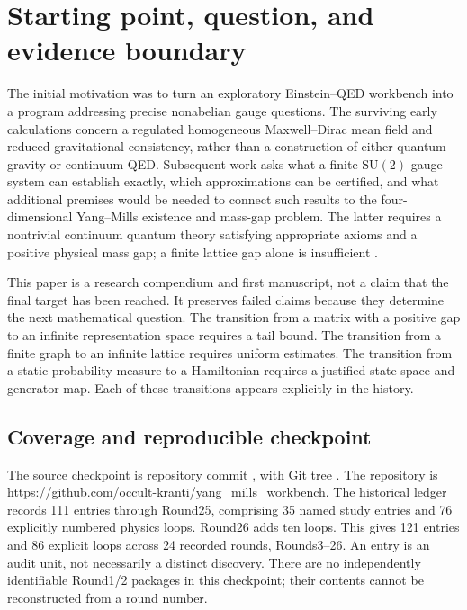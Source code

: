 \section{Starting point, question, and evidence boundary}
\label{sec:introduction}

The initial motivation was to turn an exploratory Einstein--QED workbench into a program addressing precise nonabelian gauge questions. The surviving early calculations concern a regulated homogeneous Maxwell--Dirac mean field and reduced gravitational consistency, rather than a construction of either quantum gravity or continuum QED. Subsequent work asks what a finite $\mathrm{SU}(2)$ gauge system can establish exactly, which approximations can be certified, and what additional premises would be needed to connect such results to the four-dimensional Yang--Mills existence and mass-gap problem. The latter requires a nontrivial continuum quantum theory satisfying appropriate axioms and a positive physical mass gap; a finite lattice gap alone is insufficient \cite{jaffe_witten}.

This paper is a research compendium and first manuscript, not a claim that the final target has been reached. It preserves failed claims because they determine the next mathematical question. The transition from a matrix with a positive gap to an infinite representation space requires a tail bound. The transition from a finite graph to an infinite lattice requires uniform estimates. The transition from a static probability measure to a Hamiltonian requires a justified state-space and generator map. Each of these transitions appears explicitly in the history.

\subsection{Coverage and reproducible checkpoint}
The source checkpoint is repository commit
,
with Git tree .
The repository is
\url{https://github.com/occult-kranti/yang_mills_workbench}.
The historical ledger records 111 entries through Round25, comprising 35 named study entries and 76 explicitly numbered physics loops. Round26 adds ten loops. This gives 121 entries and 86 explicit loops across 24 recorded rounds, Rounds3--26. An entry is an audit unit, not necessarily a distinct discovery. There are no independently identifiable Round1/2 packages in this checkpoint; their contents cannot be reconstructed from a round number.


